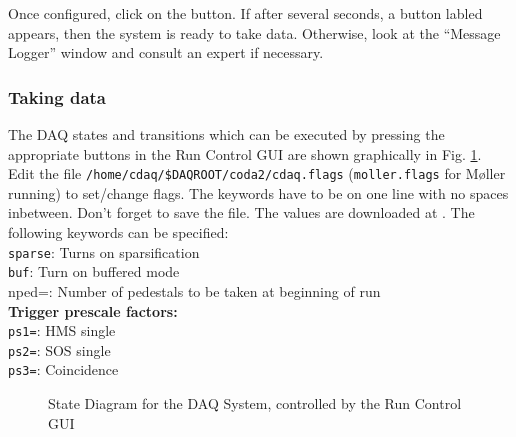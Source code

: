 Once configured, click on the  button.  If after several
seconds, a button labled  appears, then the system is ready to
take data.  Otherwise, look at the ``Message Logger'' window
and consult an expert if necessary.



\subsubsection{Taking data}
The DAQ states and transitions which can be executed by pressing the appropriate 
buttons in the Run Control GUI
are shown graphically in Fig. \ref{fig:coda_states}.
Edit the file {\tt /home/cdaq/\$DAQROOT/coda2/cdaq.flags} ({\tt moller.flags}
for M\o ller running) to set/change flags. The keywords have to be on one line 
with no spaces inbetween. Don't forget to save the file.
The values are downloaded at . The following 
keywords can be specified:\\
{\tt sparse}: Turns on sparsification\\
{\tt buf}: Turn on buffered mode\\
{nped=}: Number of pedestals to be taken at beginning of run\\
{\bf Trigger prescale factors:}\\ 
{\tt ps1=}: HMS single\\
{\tt ps2=}: SOS single\\
{\tt ps3=}: Coincidence\\ 


\begin{figure}
   \begin{center}
     \caption{State Diagram for the DAQ System, controlled by the  Run Control GUI} 
     \label{fig:coda_states}
   \end{center}
\end{figure}

